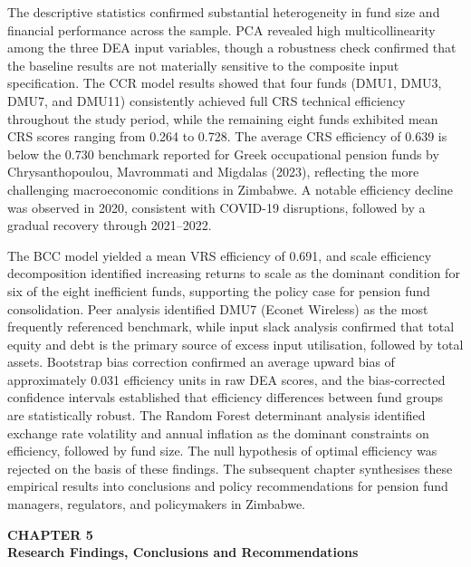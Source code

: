 \documentclass[12pt,a4paper]{article}
\begin{document}
The descriptive statistics confirmed substantial heterogeneity in fund size and financial performance across the sample. PCA revealed high multicollinearity among the three DEA input variables, though a robustness check confirmed that the baseline results are not materially sensitive to the composite input specification. The CCR model results showed that four funds (DMU1, DMU3, DMU7, and DMU11) consistently achieved full CRS technical efficiency throughout the study period, while the remaining eight funds exhibited mean CRS scores ranging from 0.264 to 0.728. The average CRS efficiency of 0.639 is below the 0.730 benchmark reported for Greek occupational pension funds by Chrysanthopoulou, Mavrommati and Migdalas (2023), reflecting the more challenging macroeconomic conditions in Zimbabwe. A notable efficiency decline was observed in 2020, consistent with COVID-19 disruptions, followed by a gradual recovery through 2021--2022.

The BCC model yielded a mean VRS efficiency of 0.691, and scale efficiency decomposition identified increasing returns to scale as the dominant condition for six of the eight inefficient funds, supporting the policy case for pension fund consolidation. Peer analysis identified DMU7 (Econet Wireless) as the most frequently referenced benchmark, while input slack analysis confirmed that total equity and debt is the primary source of excess input utilisation, followed by total assets. Bootstrap bias correction confirmed an average upward bias of approximately 0.031 efficiency units in raw DEA scores, and the bias-corrected confidence intervals established that efficiency differences between fund groups are statistically robust. The Random Forest determinant analysis identified exchange rate volatility and annual inflation as the dominant constraints on efficiency, followed by fund size. The null hypothesis of optimal efficiency was rejected on the basis of these findings. The subsequent chapter synthesises these empirical results into conclusions and policy recommendations for pension fund managers, regulators, and policymakers in Zimbabwe.

\begin{center}
    {\LARGE\bfseries CHAPTER 5}\\[0.5cm]
    {\Large\bfseries Research Findings, Conclusions and Recommendations}
\end{center}
\setcounter{section}{0}
\renewcommand{\thesection}{5.\arabic{section}}
{}
\end{document}
